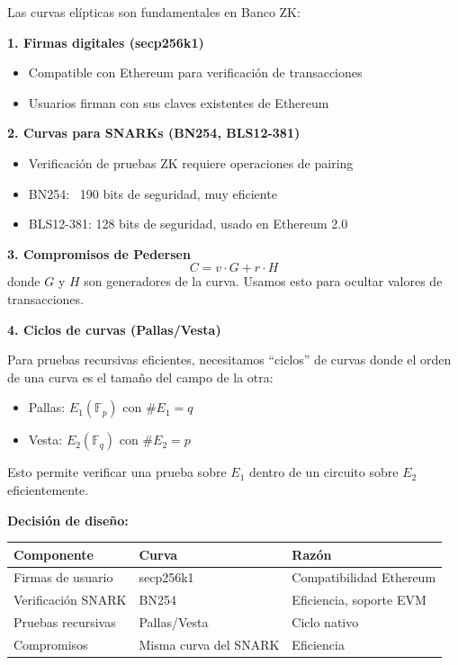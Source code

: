 \documentclass[11pt,a4paper,twoside,openright]{book}
\theoremstyle{definition}
\theoremstyle{plain}
\theoremstyle{remark}
\begin{document}
\begin{bancozk}
Las curvas elípticas son fundamentales en Banco ZK:

\textbf{1. Firmas digitales (secp256k1)}
\begin{itemize}
    \item Compatible con Ethereum para verificación de transacciones
    \item Usuarios firman con sus claves existentes de Ethereum
\end{itemize}

\textbf{2. Curvas para SNARKs (BN254, BLS12-381)}
\begin{itemize}
    \item Verificación de pruebas ZK requiere operaciones de pairing
    \item BN254: ~190 bits de seguridad, muy eficiente
    \item BLS12-381: 128 bits de seguridad, usado en Ethereum 2.0
\end{itemize}

\textbf{3. Compromisos de Pedersen}
\[
C = v \cdot G + r \cdot H
\]
donde $G$ y $H$ son generadores de la curva. Usamos esto para ocultar valores de transacciones.

\textbf{4. Ciclos de curvas (Pallas/Vesta)}

Para pruebas recursivas eficientes, necesitamos ``ciclos'' de curvas donde el orden de una curva es el tamaño del campo de la otra:
\begin{itemize}
    \item Pallas: $E_1(\mathbb{F}_p)$ con $\#E_1 = q$
    \item Vesta: $E_2(\mathbb{F}_q)$ con $\#E_2 = p$
\end{itemize}

Esto permite verificar una prueba sobre $E_1$ dentro de un circuito sobre $E_2$ eficientemente.

\textbf{Decisión de diseño:}
\begin{center}
\begin{tabular}{lll}
\toprule
\textbf{Componente} & \textbf{Curva} & \textbf{Razón} \\
\midrule
Firmas de usuario & secp256k1 & Compatibilidad Ethereum \\
Verificación SNARK & BN254 & Eficiencia, soporte EVM \\
Pruebas recursivas & Pallas/Vesta & Ciclo nativo \\
Compromisos & Misma curva del SNARK & Eficiencia \\
\bottomrule
\end{tabular}
\end{center}
\end{bancozk}
\end{document}
